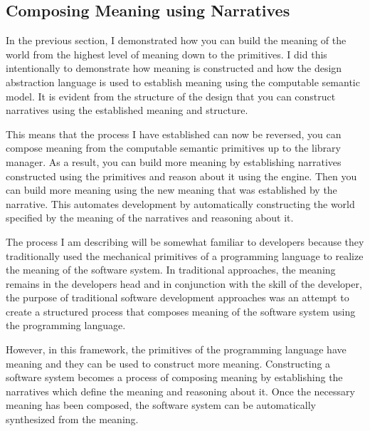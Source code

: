 \subsection{Composing Meaning using Narratives}

In the previous section, I demonstrated how you can build the meaning of the world from the highest level of meaning down to the primitives. I did this intentionally to demonstrate how meaning is constructed and how the design abstraction language is used to establish meaning using the computable semantic model. It is evident from the structure of the design that you can construct narratives using the established meaning and structure.

This means that the process I have established can now be reversed, you can compose meaning from the computable semantic primitives up to the library manager. As a result, you can build more meaning by establishing narratives constructed using the primitives and reason about it using the engine. Then you can build more meaning using the new meaning that was established by the narrative. This automates development by automatically constructing the world specified by the meaning of the narratives and reasoning about it.

The process I am describing will be somewhat familiar to developers because they traditionally used the mechanical primitives of a programming language to realize the meaning of the software system. In traditional approaches, the meaning remains in the developers head and in conjunction with the skill of the developer, the purpose of traditional software development approaches was an attempt to create a structured process that composes meaning of the software system using the programming language. 

However, in this framework, the primitives of the programming language have meaning and they can be used to construct more meaning. Constructing a software system becomes a process of composing meaning by establishing the narratives which define the meaning and reasoning about it. Once the necessary meaning has been composed, the software system can be automatically synthesized from the meaning. 
